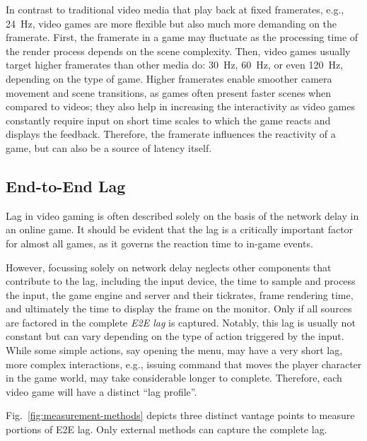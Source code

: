 In contrast to traditional video media that play back at fixed framerates, e.g., \SI{24}{\hertz}, video games are more flexible but also much more demanding on the framerate. First, the framerate in a game may fluctuate as the processing time of the render process depends on the scene complexity.
Then, video games usually target higher framerates than other media do: \SI{30}{\hertz}, \SI{60}{\hertz}, or even \SI{120}{\hertz}, depending on the type of game. Higher framerates enable smoother camera movement and scene transitions, as games often present faster scenes when compared to videos; they also help in increasing the interactivity as video games constantly require input on short time scales to which the game reacts and displays the feedback. Therefore, the framerate influences the reactivity of a game, but can also be a source of latency itself.


\subsection{End-to-End Lag}
\label{sec:e2e-lag}

Lag in video gaming is often described solely on the basis of the network delay in an online game. It should be evident that the lag is a critically important factor for almost all games, as it governs the reaction time to in-game events.

However, focussing solely on network delay neglects other components that contribute to the lag, including the input device, the time to sample and process the input, the game engine and server and their tickrates, frame rendering time, and ultimately the time to display the frame on the monitor. Only if all sources are factored in the complete \textit{\gls{E2E} lag} is captured. Notably, this lag is usually not constant but can vary depending on the type of action triggered by the input. While some simple actions, say opening the menu, may have a very short lag, more complex interactions, e.g., issuing command that moves the player character in the game world, may take considerable longer to complete. %
Therefore, each video game will have a distinct ``lag profile''.

Fig.~\ref{fig:measurement-methods} depicts three distinct vantage points to measure portions of \gls{E2E} lag. Only external methods can capture the complete lag.

